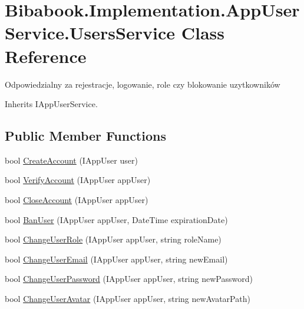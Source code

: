 \hypertarget{class_bibabook_1_1_implementation_1_1_app_user_service_1_1_users_service}{}\section{Bibabook.\+Implementation.\+App\+User\+Service.\+Users\+Service Class Reference}
\label{class_bibabook_1_1_implementation_1_1_app_user_service_1_1_users_service}


Odpowiedzialny za rejestracje, logowanie, role czy blokowanie uzytkowników  




Inherits I\+App\+User\+Service.

\subsection*{Public Member Functions}
\begin{DoxyCompactItemize}
\item 
bool \hyperlink{class_bibabook_1_1_implementation_1_1_app_user_service_1_1_users_service_a09099199f03613616cbb6b9881e2d613}{Create\+Account} (I\+App\+User user)
\item 
bool \hyperlink{class_bibabook_1_1_implementation_1_1_app_user_service_1_1_users_service_abfc1fda74aa855425d06128ff4c57d0c}{Verify\+Account} (I\+App\+User app\+User)
\item 
bool \hyperlink{class_bibabook_1_1_implementation_1_1_app_user_service_1_1_users_service_a2467be014a736abc21385626434d390b}{Close\+Account} (I\+App\+User app\+User)
\item 
bool \hyperlink{class_bibabook_1_1_implementation_1_1_app_user_service_1_1_users_service_a65c9624f8d564a1b1f306b38e8f9ad3d}{Ban\+User} (I\+App\+User app\+User, Date\+Time expiration\+Date)
\item 
bool \hyperlink{class_bibabook_1_1_implementation_1_1_app_user_service_1_1_users_service_a718d33eb145f2d5bfc681a6d00b56749}{Change\+User\+Role} (I\+App\+User app\+User, string role\+Name)
\item 
bool \hyperlink{class_bibabook_1_1_implementation_1_1_app_user_service_1_1_users_service_a8c0cea13f89ce8ae867eadc371c51024}{Change\+User\+Email} (I\+App\+User app\+User, string new\+Email)
\item 
bool \hyperlink{class_bibabook_1_1_implementation_1_1_app_user_service_1_1_users_service_a97def95e4efde929fbbdf6246725a495}{Change\+User\+Password} (I\+App\+User app\+User, string new\+Password)
\item 
bool \hyperlink{class_bibabook_1_1_implementation_1_1_app_user_service_1_1_users_service_a172e5f93c439973c406e67412ce9392b}{Change\+User\+Avatar} (I\+App\+User app\+User, string new\+Avatar\+Path)
\end{DoxyCompactItemize}


